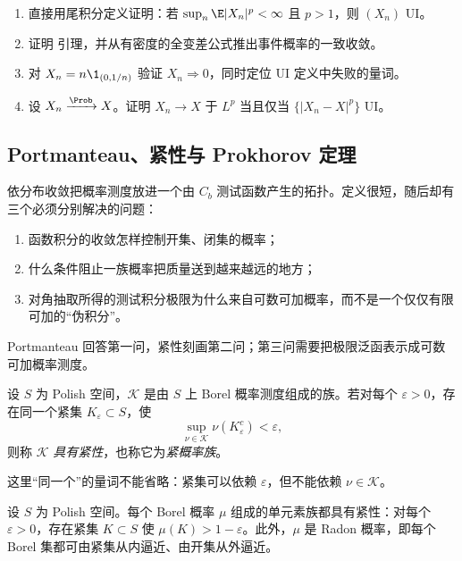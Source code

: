 \begin{exercise}[UI 与质量守恒]\label{exercise:5-3-2-1}
\begin{enumerate}
  \item 直接用尾积分定义证明：若 $\sup_n\E|X_n|^p<\infty$ 且 $p>1$，则 $(X_n)$ UI。
  \item 证明 \Scheffe{} 引理，并从有密度的全变差公式推出事件概率的一致收敛。
  \item 对 $X_n=n\1_{(0,1/n)}$ 验证 $X_n\Rightarrow0$，同时定位 UI 定义中失败的量词。
  \item 设 $X_n\xrightarrow{\Prob}X$。证明 $X_n\to X$ 于 $L^p$ 当且仅当 $\{|X_n-X|^p\}$ UI。
\end{enumerate}
\end{exercise}
\subsection{Portmanteau、紧性与 Prokhorov 定理}\label{subsec:5-3-3}

依分布收敛把概率测度放进一个由 $C_b$ 测试函数产生的拓扑。定义很短，随后却有三个必须分别解决的问题：
\begin{enumerate}
  \item 函数积分的收敛怎样控制开集、闭集的概率；
  \item 什么条件阻止一族概率把质量送到越来越远的地方；
  \item 对角抽取所得的测试积分极限为什么来自可数可加概率，而不是一个仅仅有限可加的“伪积分”。
\end{enumerate}
Portmanteau 回答第一问，紧性刻画第二问；第三问需要把极限泛函表示成可数可加概率测度。

\begin{definition}[概率族的紧性]\label{def:5-3-3-3}
设 $S$ 为 Polish 空间，$\mathcal K$ 是由 $S$ 上 Borel 概率测度组成的族。若对每个
$\varepsilon>0$，存在同一个紧集 $K_\varepsilon\subset S$，使
\[
 \sup_{\nu\in\mathcal K}\nu(K_\varepsilon^c)<\varepsilon,
\]
则称 $\mathcal K$ \emph{具有紧性}，也称它为\emph{紧概率族}。
\end{definition}

这里“同一个”的量词不能省略：紧集可以依赖 $\varepsilon$，但不能依赖
$\nu\in\mathcal K$。

\begin{proposition}\label{proposition:5-3-3-polish-radon}
设 $S$ 为 Polish 空间。每个 Borel 概率 $\mu$ 组成的单元素族都具有紧性：对每个 $\varepsilon>0$，存在紧集
$K\subset S$ 使 $\mu(K)>1-\varepsilon$。此外，$\mu$ 是 Radon 概率，即每个 Borel 集都可由紧集从内逼近、由开集从外逼近。
\end{proposition}

